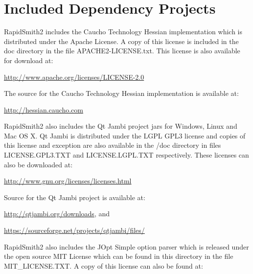 \newpage
\section{Included Dependency Projects}
RapidSmith2 includes the Caucho Technology Hessian implementation which is distributed
under the Apache License. A copy of this license is included in the doc
directory in the file APACHE2-LICENSE.txt. This license is also available for
download at:

\noindent
\hyperref[http://www.apache.org/licenses/LICENSE-2.0]{\color{blue}http://www.apache.org/licenses/LICENSE-2.0}

\bigbreak \noindent
The source for the Caucho Technology Hessian implementation is available at:

\noindent
\hyperref[http://hessian.caucho.com]{\color{blue}http://hessian.caucho.com}

\bigbreak \noindent
RapidSmith2 also includes the Qt Jambi project jars for Windows, Linux and Mac OS X.  Qt
Jambi is distributed under the LGPL GPL3 license and copies of this license and
exception are also available in the /doc directory in files LICENSE.GPL3.TXT and
LICENSE.LGPL.TXT respectively. These licenses can also be downloaded at:

\noindent
\hyperref[http://www.gnu.org/licenses/licenses.html]{\color{blue}http://www.gnu.org/licenses/licenses.html}

\bigbreak \noindent
Source for the Qt Jambi project is available at:

\noindent
\hyperref[http://qtjambi.org/downloads]{\color{blue}http://qtjambi.org/downloads}, and

\noindent
\hyperref[https://sourceforge.net/projects/qtjambi/files/]{\color{blue}https://sourceforge.net/projects/qtjambi/files/}

\bigbreak \noindent
RapidSmith2 also includes the JOpt Simple option parser which is released under
the open source MIT License which can be found in this directory in the file
MIT\_LICENSE.TXT.  A copy of this license can also be found at:

